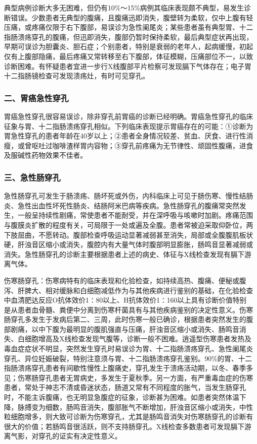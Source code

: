 典型病例诊断大多无困难，但仍有10\%～15\%病例其临床表现颇不典型，易发生诊断错误。少数患者无典型的腹痛，且腹痛迅即消失，腹壁转为柔软，仅中上腹有轻压痛，或疼痛仅限于右下腹部，易误诊为急性阑尾炎；某些患者虽有典型胃、十二指肠溃疡穿孔的腹痛，但迅即消失，腹部仍暂时保持柔软，最后典型症状再出现，早期可误诊为胆囊炎、胆石症；个别患者，特别是衰弱的老年人，起病缓慢，初起仅有上腹部隐痛，最后疼痛又常转移至右下腹部，体征模糊，压痛部位不一，以致诊断困难。有怀疑患者宜进一步行X线腹部平片检察可发现膈下气体存在；电子胃十二指肠镜检查可发现溃疡灶，有时可见穿孔。

\subsubsection{二、胃癌急性穿孔}

胃癌急性穿孔很容易误诊，除非穿孔前胃癌的诊断已经明确。胃癌急性穿孔的临床征象与胃、十二指肠溃疡穿孔相似。下列临床表现提示胃癌存在的可能：①诊断为胃急性穿孔的患者年龄在40岁以上；②患者全身情况较差、贫血、厌食、进行性消瘦，或曾呕吐过咖啡渣样胃内容物；③穿孔前疼痛为无节律性、顽固性腹痛，进食及服碱性药物效果不佳者。

\subsubsection{三、急性肠穿孔}

急性肠穿孔可发生于肠溃疡、肠坏死或外伤，内科临床上可见于肠伤寒、慢性结肠炎、急性出血性坏死性肠炎、结肠阿米巴病等疾病。急性肠穿孔的腹痛常突然发生，一般呈持续性剧痛，常使患者不能耐受，并在深呼吸与咳嗽时加剧。疼痛范围与腹膜炎扩散的程度有关，可局限于一处或遍及全腹。患者常被迫采取仰卧位，两下肢屈曲，不愿转动。腹部检查呼吸运动显著减弱甚至消失，局部或全腹腹肌板状硬，肝浊音区缩小或消失，腹腔内有大量气体时腹部明显膨胀，肠鸣音显著减弱或消失。急性肠穿孔的诊断主要根据患者上述的病史、体征与X线检查发现有膈下游离气体。

伤寒肠穿孔：伤寒病特有的临床表现和化验检查，如持续高热、腹痛、便秘或腹泻、肝脾大、相对缓脉和白细胞减低作为与其他疾病进行鉴别的基础，在化验检查中血清肥达反应O抗体效价1∶80以上、H抗体效价1∶160以上具有诊断价值特别是从患者血骨髓、粪便中分离到伤寒杆菌具有与其他疾病鉴别的决定性意义。伤寒肠穿孔多发生于发病后第二、三周，此时伤寒一般已确诊，根据患者突然发生的腹部剧痛，以中下腹为最明显的腹肌强直与压痛，肝浊音区缩小或消失、肠鸣音消失、白细胞增高及X线检查发现气腹等，诊断一般不困难。逍遥型伤寒患者发热及毒血症症状不明显，突然发生穿孔时易误诊为胃、十二指肠溃疡穿孔、急性阑尾炎穿孔、异位妊娠破裂，特别注意须与胃、十二指肠溃疡穿孔鉴别。90\%的胃、十二指肠溃疡穿孔患者有间歇性慢性上腹痛史，穿孔发生于溃疡活动期，以冬、春季多见；伤寒肠穿孔患者无胃病史，多发生于夏秋季。另一方面，有严重毒血症的伤寒患者，常处于神志不清或昏迷状态，肠道又常有不同程度的胀气，当发生肠穿孔时，不能主诉腹痛，也无明显急腹症的征象，诊断甚为困难。如患者突然体温下降，脉搏变为细数，肠鸣音消失，腹部胀气不断增加，肝浊音区缩小或消失，中性粒细胞增多，则大致可诊断为伤寒穿孔，尤其是肠鸣音消失对伤寒肠穿孔的诊断有很大的价值；若肠鸣音很活跃，则不支持肠穿孔。X线检查多数患者可发现膈下游离气影，对穿孔的证实有决定性意义。

